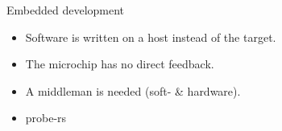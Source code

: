 \documentclass[aspectratio=1610,14pt,t]{beamer}
\begin{document}
\begin{frame}[c]{Embedded development}
  \begin{itemize}
    \item Software is written on a host instead of the target.
    \item The microchip has no direct feedback.
    \item A middleman is needed (soft- \& hardware).
    \item probe-rs
  \end{itemize}
\end{frame}
\end{document}
